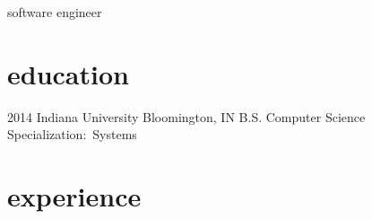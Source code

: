 \documentclass[]{friggeri-cv} %
\begin{document}
 
 
        {software engineer}





\section{education}

 \begin{entrylist}
  \entry
     {2014}
     {Indiana University}
     {Bloomington, IN}
     {B.S. Computer Science}
     {Specialization:~Systems}
    
 \end{entrylist}

 \section{experience}
\end{document}
